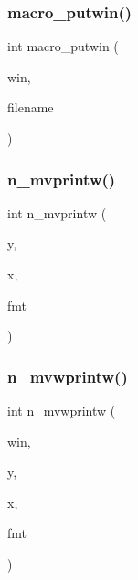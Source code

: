\subsubsection{\texorpdfstring{macro\+\_\+putwin()}{macro\_putwin()}}
{\footnotesize\ttfamily int macro\+\_\+putwin (\begin{DoxyParamCaption}\item[{W\+I\+N\+D\+OW $\ast$}]{win,  }\item[{const char $\ast$}]{filename }\end{DoxyParamCaption})}

\mbox{\label{C-macros_8c_a46f0d46efcc85de74c517a5a30d5bf8c}} 
\subsubsection{\texorpdfstring{n\+\_\+mvprintw()}{n\_mvprintw()}}
{\footnotesize\ttfamily int n\+\_\+mvprintw (\begin{DoxyParamCaption}\item[{int}]{y,  }\item[{int}]{x,  }\item[{const char $\ast$}]{fmt }\end{DoxyParamCaption})}

\mbox{\label{C-macros_8c_a84bbf8649db5247fc4d8f2d7fe3d22a0}} 
\subsubsection{\texorpdfstring{n\+\_\+mvwprintw()}{n\_mvwprintw()}}
{\footnotesize\ttfamily int n\+\_\+mvwprintw (\begin{DoxyParamCaption}\item[{W\+I\+N\+D\+OW $\ast$}]{win,  }\item[{int}]{y,  }\item[{int}]{x,  }\item[{const char $\ast$}]{fmt }\end{DoxyParamCaption})}

\mbox{\label{C-macros_8c_a11be0961dcb0e1af9a31aacb25f54116}} 
